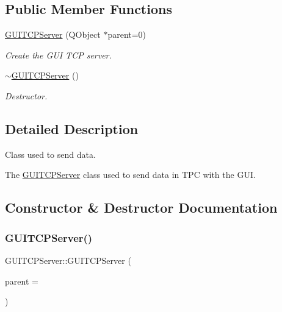 \subsection*{Public Member Functions}
\begin{DoxyCompactItemize}
\item 
\mbox{\hyperlink{class_g_u_i_t_c_p_server_a30d2ac25ce72e1ef9d6cb6547e2ac9eb}{G\+U\+I\+T\+C\+P\+Server}} (Q\+Object $\ast$parent=0)
\begin{DoxyCompactList}\small\item\em Create the G\+UI T\+CP server. \end{DoxyCompactList}\item 
\mbox{\hyperlink{class_g_u_i_t_c_p_server_a8129a89d3f6775d7d5f01d10745be126}{$\sim$\+G\+U\+I\+T\+C\+P\+Server}} ()
\begin{DoxyCompactList}\small\item\em Destructor. \end{DoxyCompactList}\end{DoxyCompactItemize}


\subsection{Detailed Description}
Class used to send data. 

The \mbox{\hyperlink{class_g_u_i_t_c_p_server}{G\+U\+I\+T\+C\+P\+Server}} class used to send data in T\+PC with the G\+UI. 

\subsection{Constructor \& Destructor Documentation}
\mbox{\label{class_g_u_i_t_c_p_server_a30d2ac25ce72e1ef9d6cb6547e2ac9eb}} 
\subsubsection{\texorpdfstring{G\+U\+I\+T\+C\+P\+Server()}{GUITCPServer()}}
{\footnotesize\ttfamily G\+U\+I\+T\+C\+P\+Server\+::\+G\+U\+I\+T\+C\+P\+Server (\begin{DoxyParamCaption}\item[{Q\+Object $\ast$}]{parent = {} }\end{DoxyParamCaption})}



